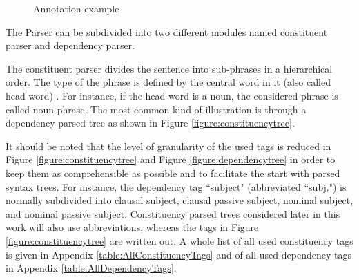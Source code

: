 \begin{figure}[h]
	\centering
	\caption{Annotation example}
	\label{figure:nlppipelineexample}
\end{figure}

The Parser can be subdivided into two different modules named constituent parser and dependency parser. 

The constituent parser divides the sentence into sub-phrases in a hierarchical order. The type of the phrase is defined by the central word in it (also called head word) \citep{jurafsky2014speech}. For instance, if the head word is a noun, the considered phrase is called noun-phrase. The most common kind of illustration is through a dependency parsed tree as shown in Figure \ref{figure:constituencytree}.

It should be noted that the level of granularity of the used tags is reduced in Figure \ref{figure:constituencytree} and Figure \ref{figure:dependencytree} in order to keep them as comprehensible as possible and to facilitate the start with parsed syntax trees. For instance, the dependency tag ``subject"  (abbreviated ``subj.") is normally subdivided into clausal subject, clausal passive subject, nominal subject, and nominal passive subject. Constituency parsed trees considered later in this work will also use abbreviations, whereas the tags in Figure \ref{figure:constituencytree} are written out. A whole list of all used constituency tags is given in Appendix \ref{table:AllConstituencyTags} and of all used dependency tags in Appendix \ref{table:AllDependencyTags}.

